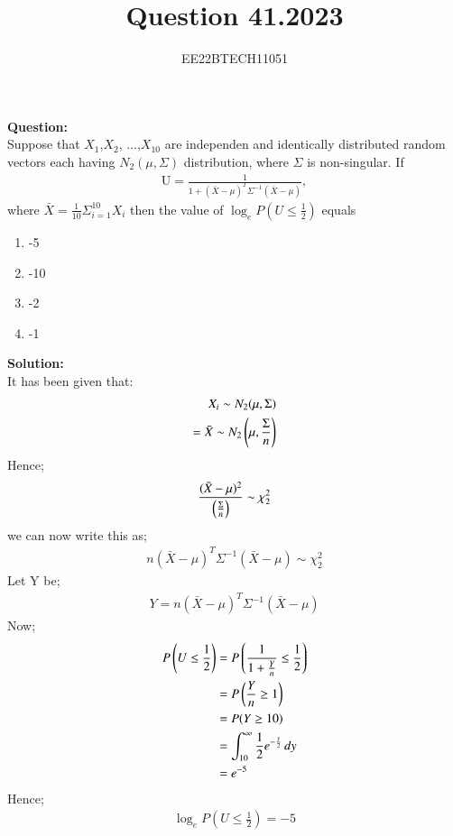 \documentclass[journal,12pt,onecolumn]{IEEEtran}
\theoremstyle{remark}
\begin{document}

\vspace{3cm}


\title{Question 41.2023}
\author{EE22BTECH11051}

\maketitle
\vspace{3cm}

\textbf{Question:} \\
Suppose that $X_1$,$X_2$, ...,$X_{10}$ are independen and identically distributed random vectors each having
$N_2(\mu,\Sigma)$ distribution, where $\Sigma$ is non-singular. If
\begin{align}
    \text{U} = \frac{1}{1+(\bar{X} - \mu)^T\Sigma^{-1}(\bar{X} - \mu)} ,
\end{align}
where $\bar X = \frac{1}{10}\Sigma_{i = 1}^{10} X_{i}$ then the value of $\log_e P (U \le \frac{1}{2})$ equals

\begin{enumerate}
    \item -5
    \item -10
    \item -2
    \item -1
\end{enumerate}
\textbf{Solution:}\\
It has been given that:
\begin{align}
    X_{i} \sim N_2(\mu,\Sigma)\\
    =\bar{X} \sim N_2\left(\mu,\frac{\Sigma}{n}\right)
\end{align}
Hence;
\begin{align}
    \frac{(\bar{X}-\mu)^2}{\left(\frac{\Sigma}{n}\right)} \sim \chi^{2}_{2}
\end{align}
we can now write this as;
\begin{align}
    n(\bar{X} - \mu)^T\Sigma^{-1}(\bar{X} - \mu) \sim \chi^{2}_{2}
\end{align}
Let Y be;
\begin{align}
    Y = n(\bar{X} - \mu)^T\Sigma^{-1}(\bar{X} - \mu)
\end{align}
Now;
\begin{align}
    P\left(U \le \frac{1}{2}\right)
    &= P\left(\frac{1}{1+\frac{Y}{n}} \le \frac{1}{2}\right)\\
    &= P\left(\frac{Y}{n} \ge 1\right)\\
    &= P(Y \ge 10)\\
    &= \int_{10}^{\infty} \frac{1}{2}e^{-\frac{y}{2}} \,dy\\
    &= e^{-5}
\end{align}
Hence;
\begin{align}
    \log_e P (U \le \frac{1}{2}) = -5
\end{align}
\end{document}
